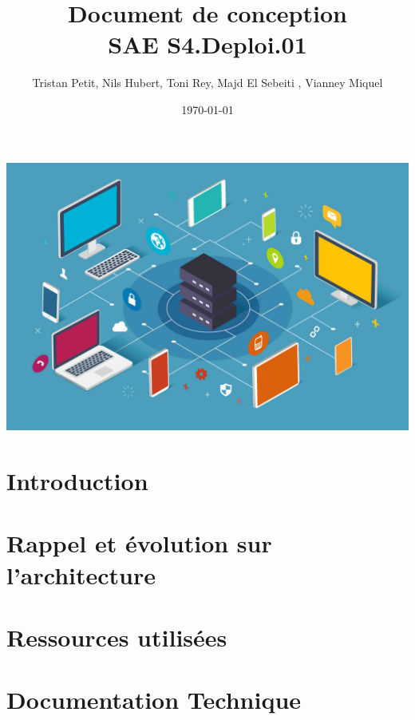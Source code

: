 \documentclass{article}
\begin{document}
\title{Document de conception \\ SAE S4.Deploi.01}
\author{Tristan Petit, Nils Hubert, Toni Rey, 
 Majd El Sebeiti , Vianney Miquel}
\date{\today}
\maketitle
\begin{center}
    \vspace{1cm} %
    \includegraphics[width=1\textwidth]{Images/Logo-project.jpeg} %
\end{center}

\maketitle

\newpage
\renewcommand{\contentsname}{Table des matières}

\tableofcontents

\newpage
{}


\section{Introduction}



\section{Rappel et évolution sur l'architecture}

\section{Ressources utilisées}

\section{Documentation Technique}
\end{document}
